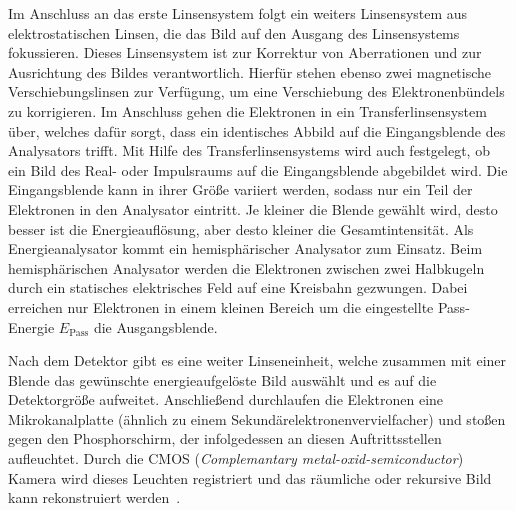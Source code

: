         Im Anschluss an das erste Linsensystem folgt ein weiters Linsensystem aus elektrostatischen Linsen, die das Bild auf den Ausgang des Linsensystems fokussieren.
        Dieses Linsensystem ist zur Korrektur von Aberrationen und zur Ausrichtung des Bildes verantwortlich.
        Hierfür stehen ebenso zwei magnetische Verschiebungslinsen zur Verfügung, um eine Verschiebung des Elektronenbündels zu korrigieren.
        Im Anschluss gehen die Elektronen in ein Transferlinsensystem über, welches dafür sorgt, dass ein identisches Abbild auf die Eingangsblende des Analysators trifft.
        Mit Hilfe des Transferlinsensystems wird auch festgelegt, ob ein Bild des Real- oder Impulsraums auf die Eingangsblende abgebildet wird.
        Die Eingangsblende kann in ihrer Größe variiert werden, sodass nur ein Teil der Elektronen in den Analysator eintritt.
        Je kleiner die Blende gewählt wird, desto besser ist die Energieauflösung, aber desto kleiner die Gesamtintensität.
        Als Energieanalysator kommt ein hemisphärischer Analysator zum Einsatz.
        Beim hemisphärischen Analysator werden die Elektronen zwischen zwei Halbkugeln durch ein statisches elektrisches Feld auf eine Kreisbahn gezwungen.
        Dabei erreichen nur Elektronen in einem kleinen Bereich um die eingestellte Pass-Energie $E_\text{Pass}$ die Ausgangsblende.
        
        Nach dem Detektor gibt es eine weiter Linseneinheit, welche zusammen mit einer Blende das gewünschte energieaufgelöste Bild auswählt und es auf die Detektorgröße aufweitet.
        Anschließend durchlaufen die Elektronen eine Mikrokanalplatte (ähnlich zu einem Sekundärelektronenvervielfacher) und stoßen gegen den Phosphorschirm, der infolgedessen an diesen Auftrittsstellen aufleuchtet.
        Durch die CMOS (\textit{Complemantary metal-oxid-semiconductor}) Kamera wird dieses Leuchten registriert und das räumliche oder rekursive Bild kann rekonstruiert werden~\cite{SPECS-MM}.
        
